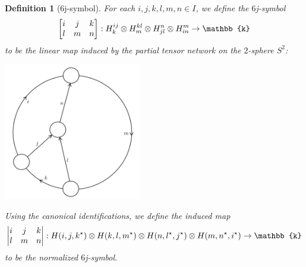 \documentclass[12pt]{extarticle}
\numberwithin{equation}{section} %
\theoremstyle{mystyle}
\newtheorem{definition}[equation]{Definition}
\begin{document}
\begin{definition}[$6$j-symbol]\label{def/6j-symbol}
  For each $i,j,k,l,m,n \in I$, we define the $6$j-symbol
  $$\sixJSymbol{i}{j}{k}{l}{m}{n}:
  H_{k}^{ij} \otimes H_{m}^{kl} \otimes H_{jl}^{n} \otimes H_{in}^{m} \to \mathbb{k}$$
  to be the linear map induced by the partial tensor network on
  the $2$-sphere $S^{2}$:
  \begin{center}
    \includegraphics[height=6cm]{6j-geometric}
  \end{center}

  \noindent Using the canonical identifications, we define the
  induced map
  $$\normalizedSixJSymbol{i}{j}{k}{l}{m}{n}: H(i,j,k^{\star}) \otimes H(k,l,m^{\star}) \otimes H(n,l^{\star},j^{\star}) \otimes H(m,n^{\star},i^{\star}) \to \mathbb{k}$$
  to be the normalized $6$j-symbol.
\end{definition}
\end{document}
